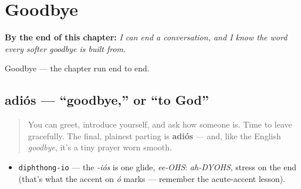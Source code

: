 
\chapter{Goodbye}
\label{ch:goodbye}

\begin{chapteropening}
\textbf{By the end of this chapter:} \emph{I can end a conversation, and I know the word every softer goodbye is built from.}

Goodbye — the chapter run end to end.
\end{chapteropening}

\section[adiós]{adiós — \textquotedblleft{}goodbye,\textquotedblright{} or \textquotedblleft{}to God\textquotedblright{}}

\label{lesson:ES-C05-adios}



\begin{quote}
You can greet, introduce yourself, and ask how someone is. Time to leave gracefully. The final, plainest parting is \textbf{adiós} — and, like the English \emph{goodbye}, it's a tiny prayer worn smooth.
\end{quote}

\begin{sounds}
\begin{itemize}
\raggedright
  \item \texttt{diphthong-io} — the \emph{-iós} is one glide, \emph{ee-OHS}: \emph{ah-DYOHS}, stress on the end (that's what the accent on \emph{ó} marks — remember the acute-accent lesson).
\end{itemize}
\end{sounds}

